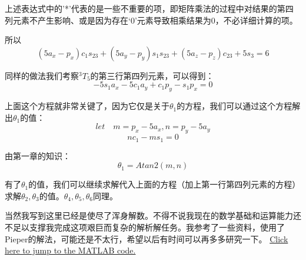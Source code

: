 \documentclass{ctexart}
\begin{document}
上述表达式中的'*'代表的是一些不重要的项，即矩阵乘法的过程中对结果的第四列元素不产生影响、或是因为存在‘0’元素导致相乘结果为0，不必详细计算的项。

所以
$$
(5a_x-p_x)c_1s_{23}+(5a_y-p_y)s_1s_{23}+(5a_z-p_z)c_{23}+5s_3=6
$$

同样的做法我们考察$^3T_5$的第三行第四列元素，可以得到：
$$
-5s_1a_x-5c_1a_y+c_1p_y-s_1p_x=0
$$

上面这个方程就非常关键了，因为它仅是关于$\theta_1$的方程，我们可以通过这个方程解出$\theta_1$的值：
$$
let \quad m=p_x-5a_x,n=p_y-5a_y
$$
$$
nc_1-ms_1=0
$$

由第一章的知识：
$$
\theta_1 = Atan2(m,n)
$$

有了$\theta_1$的值，我们可以继续求解代入上面的方程（加上第一行第四列元素的方程）求解$\theta_2,\theta_3$的值。$\theta_4,\theta_5,\theta_6$同理。

当然我写到这里已经是使尽了浑身解数。不得不说我现在的数学基础和运算能力还不足以支撑我完成这项艰巨而复杂的解析解任务。我参考了一些资料，使用了Pieper的解法，可能还是不太行，希望以后有时间可以再多多研究一下。
\href{src/Rhw_3_2_3_main.m}{Click here to jump to the MATLAB code.}
\end{document}
